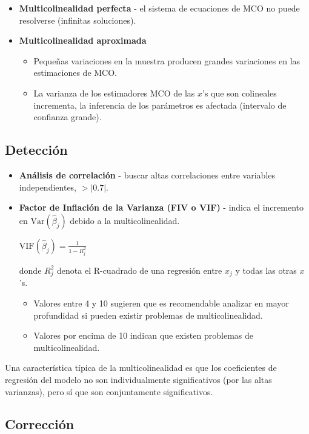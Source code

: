\documentclass[10pt, a4paper, landscape]{extarticle}
\newcommand{\Var}{\mathrm{Var}}
\begin{document}
\begin{multicols}{3}
\begin{itemize}[leftmargin=*]
	\item \textbf{Multicolinealidad perfecta} - el sistema de ecuaciones de MCO no puede resolverse (infinitas soluciones).
	\item \textbf{Multicolinealidad aproximada}
	\begin{itemize}[leftmargin=*]
		\item Pequeñas variaciones en la muestra producen grandes variaciones en las estimaciones de MCO.
		\item La varianza de los estimadores MCO de las $x$'s que son colineales incrementa, la inferencia de los parámetros es afectada (intervalo de confianza grande).
	\end{itemize}
\end{itemize}

\subsection*{Detección}

\begin{itemize}[leftmargin=*]
	\item \textbf{Análisis de correlación} - buscar altas correlaciones entre variables independientes, $> \lvert 0.7 \rvert$.
	\item \textbf{Factor de Inflación de la Varianza (FIV o VIF)} - indica el incremento en $\Var(\hat{\beta}_j)$ debido a la multicolinealidad.
	\begin{center}
			$\mathrm{VIF} (\hat{\beta}_j) = \frac{1}{1-R_j^2}$
	\end{center}
	donde $R^2_j$ denota el R-cuadrado de una regresión entre $x_j$ y todas las otras $x$'s. 
	\begin{itemize}[leftmargin=*]
		\item Valores entre 4 y 10 sugieren que es recomendable analizar en mayor profundidad si pueden existir problemas de multicolinealidad.
		\item Valores por encima de 10 indican que existen problemas de multicolinealidad.
	\end{itemize}
\end{itemize}

Una característica típica de la multicolinealidad es que los coeficientes de regresión del modelo no son individualmente significativos (por las altas varianzas), pero sí que son conjuntamente significativos.

\subsection*{Corrección}


\end{multicols}
\end{document}
